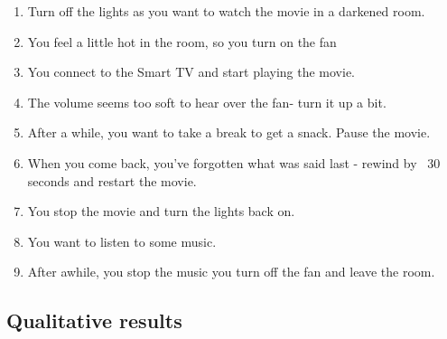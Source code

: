 \small{
\begin{enumerate}
\item Turn off the lights as you want to watch the movie in a darkened room.
\item You feel a little hot in the room, so you turn on the fan
\item You connect to the Smart TV and start playing the movie. 
\item The volume seems too soft to hear over the fan- turn it up a bit. 
\item After a while, you want to take a break to get a snack. Pause the movie. 
\item When you come back, you've forgotten what was said last - rewind by ~30 seconds and restart the movie. 
\item You stop the movie and turn the lights back on.
\item You want to listen to some music.
\item After awhile, you stop the music
you turn off the fan and leave the room.
\end{enumerate}}

\subsection{Qualitative results}

